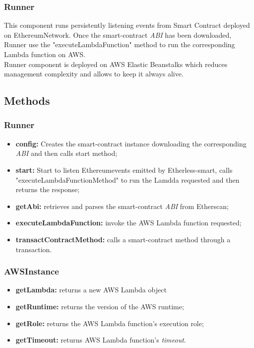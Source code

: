 \subsubsection{Runner}
This component runs persistently listening events from Smart Contract deployed on Ethereum\glo Network. Once the smart-contract \textit{ABI\glo} has been downloaded, Runner use the "executeLambdaFunction" method to run the corresponding Lambda function on AWS.\\ Runner component is deployed on AWS Elastic Beanstalks which reduces management complexity and allows to keep it always alive. 


\subsection{Methods}
\subsubsection{Runner}
\begin{itemize}
	\item \textbf{config:} Creates the smart-contract instance downloading the corresponding \textit{ABI\glo} and then calls start method;
	\item \textbf{start:} Start to listen Ethereum\glo events emitted by Etherless-smart, calls "executeLambdaFunctionMethod" to run the Lamdda requested and then returns the response;
	\item \textbf{getAbi:} retrieves and parses the smart-contract \textit{ABI\glo} from Etherscan;
	\item \textbf{executeLambdaFunction:} invoke the AWS Lambda function requested;
	\item \textbf{transactContractMethod:} calls a smart-contract method through a transaction.
\end{itemize}
\subsubsection{AWSInstance}
\begin{itemize}
	\item \textbf{getLambda:} returns a new AWS Lambda object
	\item \textbf{getRuntime:} returns the version of the AWS runtime;
	\item \textbf{getRole:} returns the AWS Lambda function's execution role;
	\item \textbf{getTimeout:} returns AWS Lambda function's \textit{timeout\glos}. 
\end{itemize}

